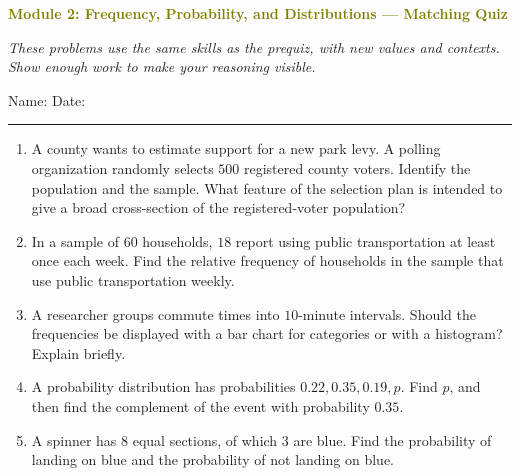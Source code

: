 \documentclass[11pt]{article}
\newcommand{\quizhead}[2]{%
  \clearpage
  {\Large\bfseries\textcolor{olive}{Module #1: #2 — Matching Quiz}}\par
  \textit{These problems use the same skills as the prequiz, with new values and contexts. Show enough work to make your reasoning visible.}\par
  Name: \hspace{2.6in} Date: \hspace{1.1in}\par
  \vspace{2pt}\textcolor{gold}{\rule{\linewidth}{1.2pt}}\par\smallskip
}
\newcommand{\workmed}{\par\vspace{0.62in}}
\begin{document}
\quizhead{2}{Frequency, Probability, and Distributions}
\begin{enumerate}
\item A county wants to estimate support for a new park levy. A polling organization randomly selects \(500\) registered county voters. Identify the population and the sample. What feature of the selection plan is intended to give a broad cross-section of the registered-voter population?
\workmed

\item In a sample of \(60\) households, \(18\) report using public transportation at least once each week. Find the relative frequency of households in the sample that use public transportation weekly.
\workmed

\item A researcher groups commute times into \(10\)-minute intervals. Should the frequencies be displayed with a bar chart for categories or with a histogram? Explain briefly.
\workmed

\item A probability distribution has probabilities \(0.22,0.35,0.19,p\). Find \(p\), and then find the complement of the event with probability \(0.35\).
\workmed

\item A spinner has \(8\) equal sections, of which \(3\) are blue. Find the probability of landing on blue and the probability of not landing on blue.
\workmed
\end{enumerate}
\end{document}
